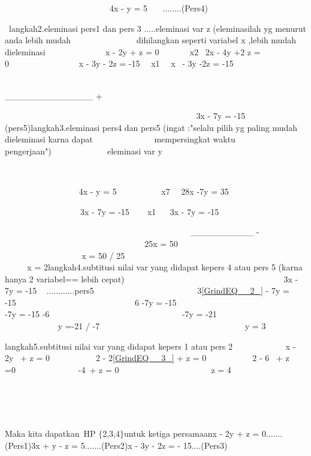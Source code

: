 \documentclass[11pt,fleqn]{book} %
\begin{document}
\begin{myEnumerate}
\begin{itemize}
\noindent ~~~~~~~~~~~~~~~~~~~~~~~~~4x - y = 5~~~ ........(Pers4)

\noindent ~langkah2.eleminasi pers1 dan pers 3 .....eleminasi var z (eleminasilah yg menurut anda lebih mudah~~~~~~~~~~~~~~~ dihilangkan seperti variabel x ,lebih mudah dieleminasi~ ~ ~ ~ ~ ~ ~ ~~ x - 2y + z = 0 ~~~~~~ {\textbar}x2{\textbar}~ 2x - 4y +2 z = 0~~~~~~~~~~~~~~~~ x - 3y - 2z = -15~~ {\textbar}x1{\textbar}~~ x~ - 3y -2z = -15

\noindent ~~~~~~~~~~~~~~~~~~~~~~~~~~~~~~~~~~~~~~~~~~~~~~~~~~~~~ \_\_\_\_\_\_\_\_\_\_\_\_\_\_ + ~ ~ ~

\noindent ~ ~ ~ ~ ~ ~ ~ ~ ~ ~ ~ ~ ~ ~ ~ ~ ~ ~ ~ ~ ~ ~ ~ ~ ~~ ~~~3x - 7y = -15~~~~~~~ (pers5)langkah3.eleminasi pers4 dan pers5 (ingat :"selalu pilih yg paling mudah dieleminasi karna dapat~~~~~~~~~~~~~~ mempersingkat waktu pengerjaan")~~~~~~~~~~ ~~ eleminasi var y

\noindent ~~~~~~~~~~~~~~~

\noindent ~~~~~~~~~~~~~~~~~ 4x - y = 5~~~~~~~~~~ {\textbar}x7{\textbar}~~ 28x -7y = 35

\noindent ~~~~~~~~~~~~~~~~~~3x - 7y = -15 ~~~ {\textbar}x1{\textbar} ~~ 3x - 7y = -15

\noindent ~ ~ ~ ~ ~ ~ ~ ~ ~ ~ ~ ~ ~ ~ ~ ~ ~ ~ ~ ~ ~ ~ ~ ~ ~ ~~ \_\_\_\_\_\_\_\_\_\_ -~ ~ ~ ~ ~ ~ ~ ~ ~ ~ ~ ~ ~ ~ ~ ~ ~ ~ ~ ~ ~ ~ ~ ~ ~ ~ ~ 25x = 50~ ~ ~ ~ ~ ~ ~ ~ ~ ~ ~ ~ ~ ~ ~ ~ ~ ~ ~ ~ ~ ~ ~ ~ ~ ~ ~ ~ ~ x = 50 / 25~ ~ ~ ~ ~ ~ ~ ~ ~ ~ ~ ~ ~ ~ ~ ~ ~ ~ ~ ~ ~ ~ ~ ~ ~ ~ ~ ~ ~~x = 2langkah4.subtitusi nilai var yang didapat kepers 4 atau pers 5 (karna hanya 2 variabel== lebih cepat) ~ ~ ~~~~~~~~~ ~ ~ ~ ~ ~ ~~~~~~~~~~~~~~~~3x - 7y = -15 ~ ............pers5~ ~ ~ ~ ~ ~ ~~~ ~ ~ ~ ~ ~ ~~ 3\eqref{GrindEQ__2_} - 7y = -15~ ~ ~ ~ ~ ~ ~ ~ ~ ~ ~ ~ ~ ~ ~ ~ ~ 6 -7y = -15~ ~ ~ ~ ~ ~ ~ ~ ~ ~ ~ ~ ~ ~ ~ ~ ~ ~ ~ -7y = -15 -6~ ~ ~ ~ ~ ~ ~ ~ ~ ~ ~ ~ ~ ~ ~ ~ ~ ~ ~ -7y = -21~ ~ ~ ~ ~ ~ ~ ~ ~ ~ ~ ~ ~ ~ ~ ~ ~ ~ ~ ~~ y =-21 / -7~ ~ ~ ~ ~ ~ ~ ~ ~ ~ ~ ~ ~ ~ ~ ~ ~ ~ ~ ~~~y = 3~~

\noindent langkah5.subtitusi nilai var yang didapat kepers 1 atau pers 2~~ ~ ~ ~ ~ ~ ~ x - 2y ~+ z = 0~ ~ ~ ~ ~ ~~ 2 - 2\eqref{GrindEQ__3_} + z = 0~ ~ ~ ~ ~ ~~ 2 - 6 ~+ z =0~ ~ ~ ~ ~ ~ ~ ~ ~ -4~+ z = 0~ ~ ~ ~ ~ ~ ~ ~ ~ ~ ~ ~ ~~z = 4~~~~~~~~~~~~~ ~~~~~~~~~~~~~~~~~~~~~~~~~~~~~~~~~~~~

\noindent ~~ ~ ~ ~ ~ ~ ~ ~ ~ ~ ~ ~ ~ ~ ~ ~ ~ ~ ~ ~ ~ ~ ~ ~ ~ ~ ~ ~ ~ ~ ~ ~ ~ ~ ~ ~ ~ ~ ~ ~ ~ ~~ ~ ~ ~~

\noindent Maka kita dapatkan~HP $\{$2,3,4$\}$untuk ketiga persamaanx - 2y + z = 0.......(Pers1)3x + y - z = 5.......(Pers2)x - 3y - 2z = - 15....(Pers3)


\end{itemize}
\end{myEnumerate}
\end{document}
